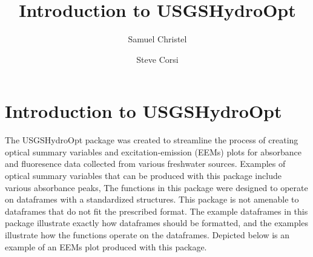 \documentclass[a4paper,11pt]{article}\usepackage[]{graphicx}\usepackage[]{color}
\begin{document}
\title{Introduction to USGSHydroOpt}
\author[1]{Samuel Christel}
\author[1]{Steve Corsi}




\maketitle
\tableofcontents

\section{Introduction to USGSHydroOpt}
The USGSHydroOpt package was created to streamline the process of creating optical summary variables and excitation-emission (EEMs) plots for absorbance and fluoresence data collected from various freshwater sources. Examples of optical summary variables that can be produced with this package include various absorbance peaks, The functions in this package were designed to operate on dataframes with a standardized structures. This package is not amenable to dataframes that do not fit the prescribed format. The example dataframes in this package illustrate exactly how dataframes should be formatted, and the examples illustrate how the functions operate on the dataframes. Depicted below is an example of an EEMs plot produced with this package.
\end{document}
